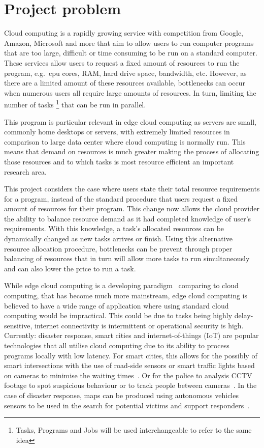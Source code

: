 \chapter{Project problem}\label{ch:project-problem}
Cloud computing is a rapidly growing service with competition from Google, Amazon, Microsoft and more that aim to
allow users to run computer programs that are too large, difficult or time consuming to be run on a standard computer.
These services allow users to request a fixed amount of resources to run the program, e.g.\ cpu cores, RAM, hard drive
space, bandwidth, etc. However, as there are a limited amount of these resources available, bottlenecks can occur
when numerous users all require large amounts of resources. In turn, limiting the number of tasks
\footnote{Tasks, Programs and Jobs will be used interchangeable to refer to the same idea} that can be run in parallel.

This program is particular relevant in edge cloud computing as servers are small, commonly home desktops or servers,
with extremely limited resources in comparison to large data center where cloud computing is normally run. This means
that demand on resources is much greater making the process of allocating those resources and to which tasks is most
resource efficient an important research area.

This project considers the case where users state their total resource requirements for a program, instead of the
standard procedure that users request a fixed amount of resources for their program. This change now allows the cloud
provider the ability to balance resource demand as it had completed knowledge of user's requirements. With this
knowledge, a task's allocated resources can be dynamically changed as new tasks arrives or finish. Using this
alternative resource allocation procedure, bottlenecks can be prevent through proper balancing of resources that in
turn will allow more tasks to run simultaneously and can also lower the price to run a task.

While edge cloud computing is a developing paradigm~\citep{mobile_edge_survey} comparing to cloud computing, that has
become much more mainstream, edge cloud computing is believed to have a wide range of application where using
standard cloud computing would be impractical. This could be due to tasks being highly delay-sensitive,
internet connectivity is intermittent or operational security is high. \\

Currently: disaster response, smart cities and internet-of-things (IoT) are popular technologies that all utilise
cloud computing due to its ability to process programs locally with low latency. For smart cities, this
allows for the possibly of smart intersections with the use of road-side sensors or smart traffic lights based
on cameras to minimise the waiting times~\citep{smart_cities_traffic_lights}. Or for the police to analysis
CCTV footage to spot suspicious behaviour or to track people between cameras~\citep{Sreenu2019}. In the case
of disaster response, maps can be produced using autonomous vehicles sensors to be used in the search for potential
victims and support responders~\citep{smart_disaster_management}.

